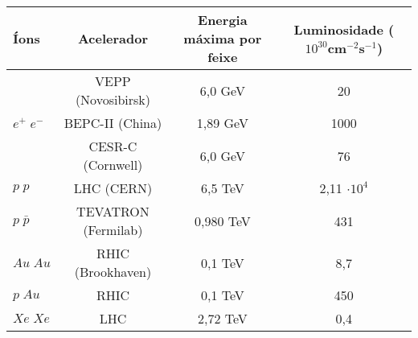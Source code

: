 \begin{tabular}{lccc}
	\toprule
	Íons & Acelerador & Energia máxima por feixe & Luminosidade
		($10^{30}$cm$^{-2}$s$^{-1}$)\\
	\midrule 
	\multirow{3}{4em}{$e^+ \; e^-$} & VEPP (Novosibirsk) & 6,0 GeV & 20 \\
	& BEPC-II (China) & 1,89 GeV & 1000 \\
	& CESR-C (Cornwell) & 6,0 GeV & 76 \\
	$p \; p$ & LHC (CERN) & 6,5 TeV & 2,11 $\cdot 10^{4}$ \\
	$p \; \bar{p}$ & TEVATRON (Fermilab) & 0,980 TeV & 431 \\
	$Au \; Au$ & RHIC (Brookhaven) & 0,1 TeV & 8,7 \\
	$p \; Au$ & RHIC & 0,1 TeV & 450 \\
	$Xe \; Xe$ & LHC & 2,72 TeV & 0,4 \\
	\bottomrule
\end{tabular}
